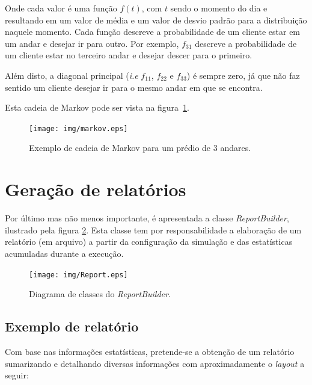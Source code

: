 Onde cada valor é uma função $f(t)$, com $t$ sendo o momento do dia e resultando
em um valor de média e um valor de desvio padrão para a distribuição naquele
momento. Cada função descreve a probabilidade de um cliente estar em um andar e
desejar ir para outro. Por exemplo, $f_{31}$ descreve a probabilidade de um
cliente estar no terceiro andar e desejar descer para o primeiro.

Além disto, a diagonal principal (\textit{i.e} $f_{11}$, $f_{22}$ e
$f_{33}$) é sempre zero, já que não faz sentido um cliente desejar ir para o
mesmo andar em que se encontra.

Esta cadeia de Markov pode ser vista na figura~\ref{fig:distribution:markov}.

\begin{figure}[htb!]
  \centering
  \texttt{[image: img/markov.eps]}
  \caption{Exemplo de cadeia de Markov para um prédio de 3 andares.}
\label{fig:distribution:markov}
\end{figure}

\section{\label{sec:model:report}Geração de relatórios}

Por último mas não menos importante, é apresentada a classe
\textit{ReportBuilder}, ilustrado pela figura \ref{fig:diagram:report}. Esta
classe tem por responsabilidade a elaboração de um relatório (em arquivo) a
partir da configuração da simulação e das estatísticas acumuladas durante a
execução.

\begin{figure}[htb!]
  \centering
  \texttt{[image: img/Report.eps]}
  \caption{Diagrama de classes do \textit{ReportBuilder}.}
\label{fig:diagram:report}
\end{figure}

\subsection{Exemplo de relatório}
Com base nas informações estatísticas, pretende-se a obtenção de um relatório
sumarizando e detalhando diversas informações com aproximadamente o
\textit{layout} a seguir:

